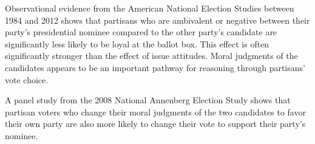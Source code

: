 Observational evidence from the American National Election Studies between 1984 and 2012 shows that partisans who are ambivalent or negative between their party's presidential nominee compared to the other party's candidate are significantly less likely to be loyal at the ballot box. This effect is often significantly stronger than the effect of issue attitudes. Moral judgments of the candidates appears to be an important pathway for reasoning through partisans' vote choice.

A panel study from the 2008 National Annenberg Election Study shows that partisan voters who change their moral judgments of the two candidates to favor their own party are also more likely to change their vote to support their party's nominee. 